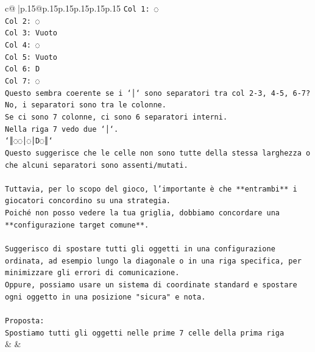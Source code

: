\documentclass{article}
\begin{document}
{\begin{supertabular}{c@{$\;$}|p{.15\linewidth}@{}p{.15\linewidth}p{.15\linewidth}p{.15\linewidth}p{.15\linewidth}p{.15\linewidth}}
{{{\texttt{Col 1: ◌} \\
\texttt{Col 2: ◌} \\
\texttt{Col 3: Vuoto} \\
\texttt{Col 4: ◌} \\
\texttt{Col 5: Vuoto} \\
\texttt{Col 6: D} \\
\texttt{Col 7: ◌} \\
\texttt{Questo sembra coerente se i `│` sono separatori tra col 2{-}3, 4{-}5, 6{-}7? No, i separatori sono tra le colonne.} \\
\texttt{Se ci sono 7 colonne, ci sono 6 separatori interni.} \\
\texttt{Nella riga 7 vedo due `│`.} \\
\texttt{`║◌◌│◌│D◌║`} \\
\texttt{Questo suggerisce che le celle non sono tutte della stessa larghezza o che alcuni separatori sono assenti/mutati.} \\
\\ 
\texttt{Tuttavia, per lo scopo del gioco, l'importante è che **entrambi** i giocatori concordino su una strategia.} \\
\texttt{Poiché non posso vedere la tua griglia, dobbiamo concordare una **configurazione target comune**.} \\
\\ 
\texttt{Suggerisco di spostare tutti gli oggetti in una configurazione ordinata, ad esempio lungo la diagonale o in una riga specifica, per minimizzare gli errori di comunicazione.} \\
\texttt{Oppure, possiamo usare un sistema di coordinate standard e spostare ogni oggetto in una posizione "sicura" e nota.} \\
\\ 
\texttt{Proposta:} \\
\texttt{Spostiamo tutti gli oggetti nelle prime 7 celle della prima riga} \\
            }
        }
    }
    & & \\ \\


\end{supertabular}}
\end{document}
